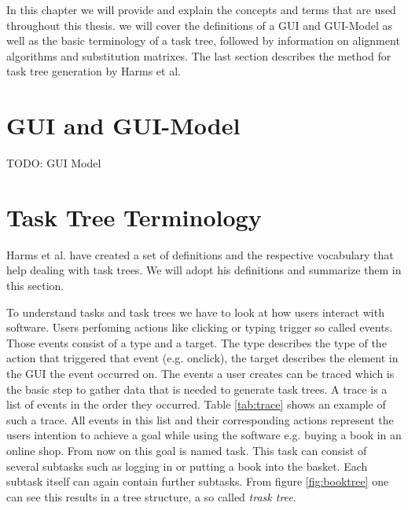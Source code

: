 In this chapter we will provide and explain the concepts and terms that are used throughout this thesis. 
we will cover the definitions of a GUI and GUI-Model as well as the basic terminology of a task tree, followed by 
 information on alignment algorithms and substitution matrixes.
The last section describes the method for task tree generation by Harms et al.\cite{harms2013}


\section{GUI and GUI-Model}
\label{sec:foundationguiandguimodel}

TODO: GUI Model

\section{Task Tree Terminology}
\label{sec:foundationtasktreeterminology}
Harms et al.\cite{harms2013} have created a set of definitions and the respective vocabulary that help dealing with task trees.
We will adopt his definitions and summarize them in this section.

To understand tasks and task trees we have to look at how users interact with software. 
Users perfoming actions like clicking or typing trigger so called events. 
Those events consist of a type and a target. 
The type describes the type of the action that triggered that event (e.g. onclick), the target describes the element in the GUI the event occurred on.
The events a user creates can be traced which is the basic step to gather data that is needed to generate task trees. 
A trace is a list of events in the order they occurred. Table \ref{tab:trace} shows an example of such a trace. 
All events in this list and their corresponding actions represent the users intention to achieve a goal while using the software e.g. buying a book 
in an online shop. From now on this goal is named task. This task can consist of several subtasks such as logging in or putting a book into the basket.
Each subtask itself can again contain further subtasks. From figure \ref{fig:booktree} one can see this results in a tree structure, a so called \textit{trask tree}.


